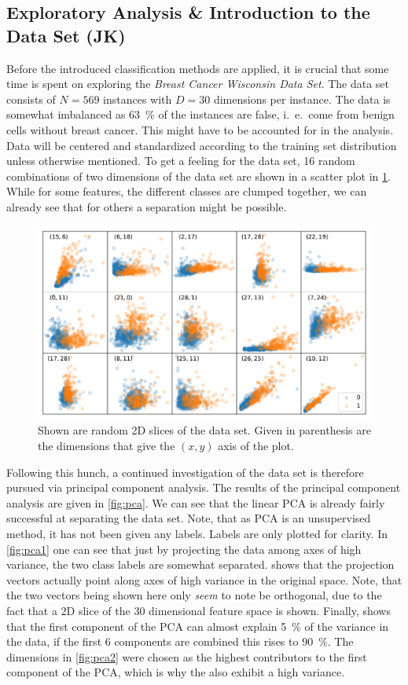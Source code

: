 \documentclass[12pt, a4paper]{scrartcl}
\begin{document}
\subsection{Exploratory Analysis \& Introduction to the Data Set (JK)}
Before the introduced classification methods are applied, it is crucial that some time is spent on exploring the \emph{Breast Cancer Wisconsin Data Set}.
The data set consists of $N=569$ instances with $D=30$ dimensions per instance. The data is somewhat imbalanced as \SI{63}{\percent} of the instances are false, i.\ e.\ come from benign cells without breast cancer. This might have to be accounted for in the analysis.
Data will be centered and standardized according to the training set distribution unless otherwise mentioned.
To get a feeling for the data set, 16 random combinations of two dimensions of the data set are shown in a scatter plot in \cref{fig:random_scatter}. While for some features, the different classes are clumped together, we can already see that for others a separation might be possible.
\begin{figure}
	\centering
	\includegraphics[width=\textwidth]{random_scatter}
	\caption{Shown are random 2D slices of the data set. Given in parenthesis are the dimensions that give the $(x,y)$ axis of the plot.}
	\label{fig:random_scatter}
\end{figure}

Following this hunch, a continued investigation of the data set is therefore pursued via principal component analysis.
The results of the principal component analysis are given in \cref{fig:pca}. We can see that the linear PCA is already fairly successful at separating the data set. Note, that as PCA is an unsupervised method, it has not been given any labels. Labels are only plotted for clarity. In \cref{fig:pca1} one can see that just by projecting the data among axes of high variance, the two class labels are somewhat separated.  shows that the projection vectors actually point along axes of high variance in the original space. Note, that the two vectors being shown here only \emph{seem} to note be orthogonal, due to the fact that a 2D slice of the 30 dimensional feature space is shown. Finally,  shows that the first component of the PCA can almost explain \SI{5}{\percent} of the variance in the data, if the first 6 components are combined this rises to \SI{90}{\percent}. 
The dimensions in \cref{fig:pca2} were chosen as the highest contributors to the first component of the PCA, which is why the also exhibit a high variance.
\end{document}
